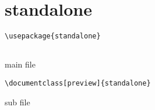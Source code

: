 \documentclass[../../latex]{subfiles}
\begin{document}
\section{standalone}

\begin{minipage}{0.47 \textwidth}
  \begin{listing}[H]
    \begin{verbatim}
\usepackage{standalone}


    \end{verbatim}
    \caption{main file}
  \end{listing}
\end{minipage}
\hfill
\begin{minipage}{0.47 \textwidth}
  \begin{listing}[H]
    \begin{verbatim}
\documentclass[preview]{standalone}
    \end{verbatim}
    \caption{sub file}
  \end{listing}
\end{minipage}
\end{document}
